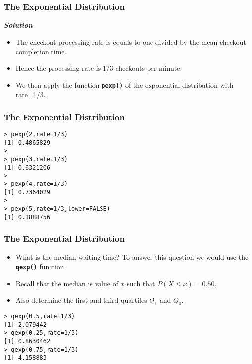 \documentclass[MAIN.tex]{subfiles}
\begin{document}
\begin{frame}[fragile]
	\frametitle{The Exponential Distribution}
	\large
\textbf{\emph{Solution}} 
\begin{itemize}
\item The checkout processing rate is equals to one divided by the mean checkout completion time. 
\item Hence the processing rate is 1/3 checkouts per minute. 
\item We then apply the function \texttt{\textbf{pexp()}} of the exponential distribution with rate=1/3.
\end{itemize} 
\end{frame}
\begin{frame}[fragile]
	\frametitle{The Exponential Distribution}
	\large


\begin{framed}
\begin{verbatim}
> pexp(2,rate=1/3)
[1] 0.4865829
>
> pexp(3,rate=1/3)
[1] 0.6321206
>
> pexp(4,rate=1/3)
[1] 0.7364029
>
> pexp(5,rate=1/3,lower=FALSE)
[1] 0.1888756
\end{verbatim}
\end{framed}
\end{frame}
\begin{frame}[fragile]
	\frametitle{The Exponential Distribution}
	\large
\begin{itemize}
\item What is the median waiting time? To answer this question we would use the \texttt{\textbf{qexp()}} function.
\item Recall that the median is value of $x$ such that $P(X \leq x) = 0.50$.
\item Also determine the first and third quartiles $Q_1$ and $Q_3$.
\end{itemize}
\begin{framed}
\begin{verbatim}
> qexp(0.5,rate=1/3)
[1] 2.079442
> qexp(0.25,rate=1/3)
[1] 0.8630462
> qexp(0.75,rate=1/3)
[1] 4.158883
\end{verbatim}
\end{framed}
\end{frame}
\end{document}
